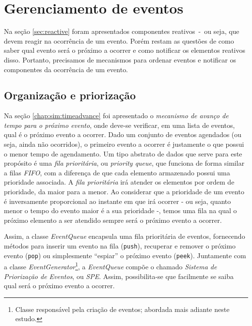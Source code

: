 \section{\label{sec:model:event}Gerenciamento de eventos}

Na seção \ref{sec:reactive} foram apresentados componentes reativos~-~ou seja,
que devem reagir na ocorrência de um evento. Porém restam as questões de como
saber qual evento será o próximo a ocorrer e como notificar os elementos
reativos disso. Portanto, precisamos de mecanismos para ordenar eventos e
notificar os componentes da ocorrência de um evento.

\subsection{Organização e priorização}

Na seção \ref{chap:sim:timeadvance} foi apresentado o \textit{mecanismo de
avanço de tempo para o próximo evento}, onde deve-se verificar, em uma lista de
eventos, qual é o próximo evento a ocorrer. Dado um conjunto de eventos
agendados (ou seja, ainda não ocorridos), o primeiro evento a ocorrer é
justamente o que possui o menor tempo de agendamento. Um tipo abstrato de dados
que serve para este propósito é uma \textit{fila prioritária}, ou
\textit{priority queue}, que funciona de forma similar a filas \textit{FIFO},
com a diferença de que cada elemento armazenado possui uma prioridade associada.
A \textit{fila prioritária} irá atender os elementos por ordem de prioridade, da
maior para a menor. Ao considerar que a prioridade de um evento é inversamente
proporcional ao instante em que irá ocorrer - ou seja, quanto menor o tempo do
evento maior é a sua prioridade -, temos uma fila na qual o próximo elemento a
ser atendido sempre será o próximo evento a ocorrer.

Assim, a classe \textit{EventQueue} encapsula uma fila prioritária de eventos,
fornecendo métodos para inserir um evento na fila (\texttt{push}), recuperar e
remover o próximo evento (\texttt{pop}) ou simplesmente ``espiar'' o próximo
evento (\texttt{peek}). Juntamente com a classe
\textit{EventGenerator}\footnote{Classe responsável pela criação de eventos;
abordada mais adiante neste estudo.}, a \textit{EventQueue} compõe o chamado
\textit{Sistema de Priorização de Eventos}, ou \textit{SPE}. Assim,
possibilita-se que facilmente se saiba qual será o próximo evento a ocorrer.

